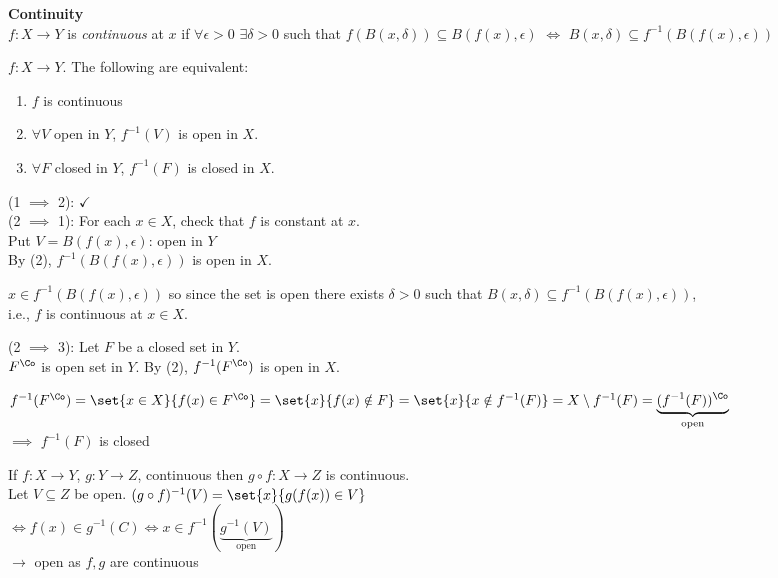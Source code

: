 \textbf{Continuity} \\
$f\colon X\to Y$ is \emph{continuous} at $x$ if $\forall\epsilon>0$ $\exists\delta>0$ such that $f(B(x,\delta))\subseteq B(f(x),\epsilon)$ $\iff$ $B(x,\delta)\subseteq f^{-1}(B(f(x),\epsilon))$

\thm $f\colon X\to Y$.  The following are equivalent:
\begin{enumerate}
\item $f$ is continuous
\item $\forall V$ open in $Y$, $f^{-1}(V)$ is open in $X$.
\item $\forall F$ closed in $Y$, $f^{-1}(F)$ is closed in $X$.
\end{enumerate}
\pf (1 $\implies$ 2): $\checkmark$ \\
(2 $\implies$ 1): For each $x\in X$, check that $f$ is constant at $x$. \\
Put $V=B(f(x),\epsilon)$: open in $Y$ \\
By (2), $f^{-1}(B(f(x),\epsilon))$ is open in $X$.

$x\in f^{-1}(B(f(x),\epsilon))$ so since the set is open there exists $\delta>0$ such that $B(x,\delta)\subseteq f^{-1}(B(f(x),\epsilon))$, \\
i.e., $f$ is continuous at $x\in X$.

(2 $\implies$ 3): Let $F$ be a closed set in $Y$. \\
$F^\Co$ is open set in $Y$.  By (2), $f^{-1}(F^\Co)$ is open in $X$.

$f^{-1}(F^\Co)=\set{x\in X}{f(x)\in F^\Co}=\set{x}{f(x)\notin F}=\set{x}{x\notin f^{-1}(F)}=X\setminus f^{-1}(F)=\underbrace{(f^{-1}(F))^\Co}_{\text{open}}$ \\
$\implies$ $f^{-1}(F)$ is closed

\cor If $f\colon X\to Y$, $g\colon Y\to Z$, continuous then $g\circ f\colon X\to Z$ is continuous. \\
\pf Let $V\subseteq Z$ be open. $(g\circ f)^{-1}(V)=\set{x}{g(f(x))\in V}$ \\
${} \iff f(x)\in g^{-1}(C) \iff x\in f^{-1}(\underbrace{g^{-1}(V)}_{\text{open}})$ \\
$\to$ open as $f,g$ are continuous

